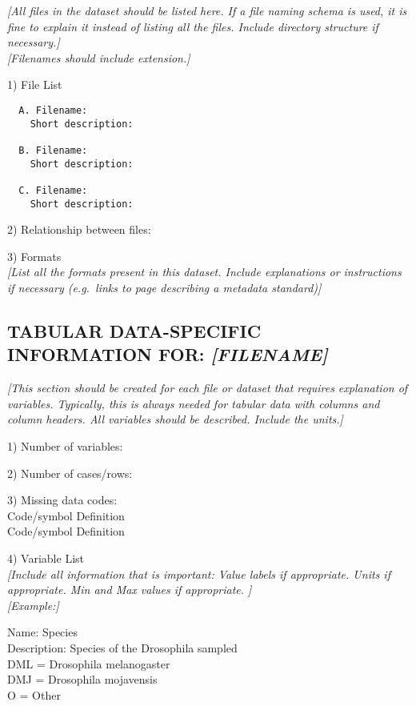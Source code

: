 \documentclass[]{article}
\begin{document}
\emph{{[}All files in the dataset should be listed here. If a file
naming schema is used, it is fine to explain it instead of listing all
the files. Include directory structure if necessary.{]}}\\
\emph{{[}Filenames should include extension.{]}}

1) File List

\begin{verbatim}
  A. Filename:
    Short description:

  B. Filename:
    Short description:

  C. Filename:
    Short description:
\end{verbatim}

2) Relationship between files:

3) Formats\\
\emph{{[}List all the formats present in this dataset. Include
explanations or instructions if necessary (e.g.~links to page describing
a metadata standard){]}}

\subsection{\texorpdfstring{TABULAR DATA-SPECIFIC INFORMATION FOR:
\emph{{[}FILENAME{]}}}{TABULAR DATA-SPECIFIC INFORMATION FOR: {[}FILENAME{]}}}\label{tabular-data-specific-information-for-filename}

\emph{{[}This section should be created for each file or dataset that
requires explanation of variables. Typically, this is always needed for
tabular data with columns and column headers. All variables should be
described. Include the units.{]}}

1) Number of variables:

2) Number of cases/rows:

3) Missing data codes:\\
Code/symbol Definition\\
Code/symbol Definition

4) Variable List\\
\emph{{[}Include all information that is important: Value labels if
appropriate. Units if appropriate. Min and Max values if appropriate.
{]}}\\
\emph{{[}Example:{]}}

Name: Species\\
Description: Species of the Drosophila sampled\\
DML = Drosophila melanogaster\\
DMJ = Drosophila mojavensis\\
O = Other
\end{document}
